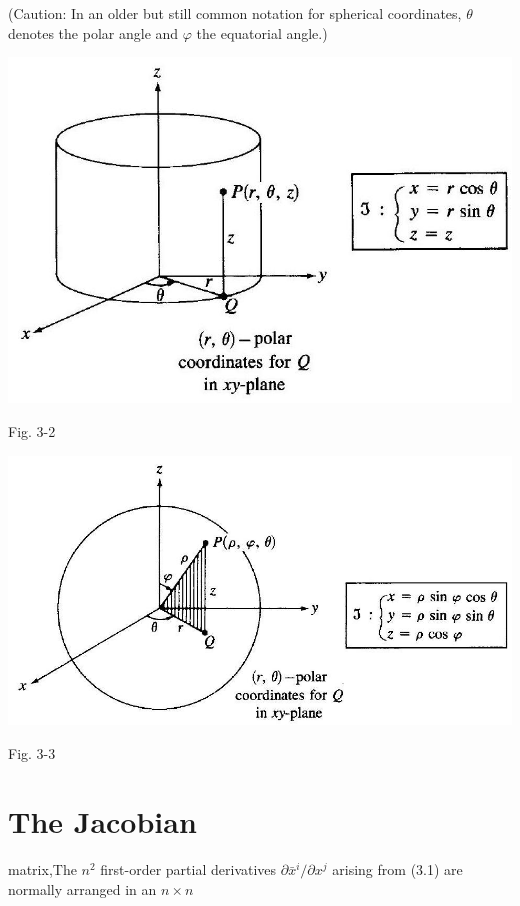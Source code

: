 \documentclass[10pt]{article}
\begin{document}
(Caution: In an older but still common notation for spherical coordinates, $\theta$ denotes the polar angle and $\varphi$ the equatorial angle.)

\begin{center}
\includegraphics[max width=\textwidth]{2024_04_03_41f90be4f896e21f0dc9g-033(1)}
\end{center}

Fig. 3-2

\begin{center}
\includegraphics[max width=\textwidth]{2024_04_03_41f90be4f896e21f0dc9g-034}
\end{center}

Fig. 3-3

\section*{The Jacobian}
 matrix,The $n^{2}$ first-order partial derivatives $\partial \bar{x}^{i} / \partial x^{j}$ arising from (3.1) are normally arranged in an $n \times n$
\end{document}
